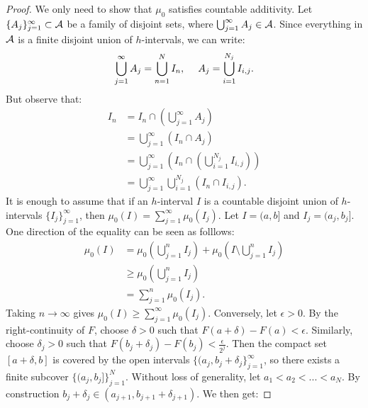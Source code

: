 \begin{proof}
            We only need to show that $\mu_0$ satisfies countable additivity. Let $\{A_j\}_{j = 1}^\infty \subset \mathcal{A}$ be a family of disjoint sets, where $\bigcup_{j = 1}^\infty A_j \in \mathcal{A}$. Since everything in $\mathcal{A}$ is a finite disjoint union of $h$-intervals, we can write:
                \begin{equation*}
                \begin{split}
                    \bigcup_{j = 1}^\infty A_j = \bigcup_{n = 1}^N I_n, \h9\h4 A_j = \bigcup_{i = 1}^{N_j}I_{i,j}.
                \end{split}
                \end{equation*}
            But observe that:
                \begin{equation*}
                \begin{split}
                    I_n 
                    & = I_n \cap  \left(\bigcup_{j = 1}^\infty A_j \right)\\
                    & = \bigcup_{j = 1}^\infty (I_n \cap A_j) \\
                    & = \bigcup_{j = 1}^\infty \left( I_n \cap \left( \bigcup_{i = 1}^{N_j}I_{i,j}\right) \right) \\
                    & = \bigcup_{j = 1}^\infty \bigcup_{i = 1}^{N_j} (I_n \cap I_{i,j}).
                \end{split}
                \end{equation*}
            It is enough to assume that if an $h$-interval $I$ is a countable disjoint union of $h$-intervals $\{I_j\}_{j = 1}^\infty$, then $\mu_0(I) = \sum_{j = 1}^\infty \mu_0(I_j)$. Let $I = (a,b]$ and $I_j = (a_j,b_j]$. One direction of the equality can be seen as folllows:
                \begin{equation*}
                \begin{split}
                    \mu_0(I) 
                    & = \mu_0\left(\bigcup_{j = 1}^n I_j\right) + \mu_0\left(I \setminus \bigcup_{j = 1}^n I_j\right) \\
                    & \geq \mu_0 \left( \bigcup_{j = 1}^n I_j \right) \\
                    & = \sum_{j = 1}^n \mu_0(I_j).
                \end{split}
                \end{equation*}
            Taking $n \rightarrow \infty$ gives $\mu_0(I) \geq \sum_{j = 1}^\infty \mu_0(I_j)$. Conversely, let $\epsilon > 0$. By the right-continuity of $F$, choose $\delta > 0$ such that $F(a + \delta) - F(a) < \epsilon$. Similarly, choose $\delta_j > 0$ such that $F(b_j + \delta_j) - F(b_j) < \frac{\epsilon}{2^j}$. Then the compact set $[a+\delta,b]$ is covered by the open intervals $\{(a_j,b_j + \delta_j\}_{j = 1}^\infty $, so there exists a finite subcover $\{ (a_j,b_j]\}_{j = 1}^N$. Without loss of generality, let $a_1 < a_2 < ... < a_N$. By construction $b_j + \delta_j \in (a_{j + 1}, b_{j+1} + \delta_{j+1})$. We then get:

\end{proof}
